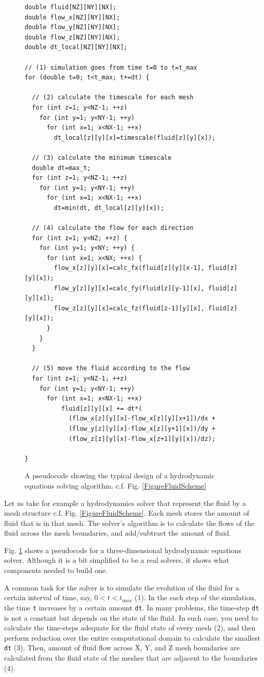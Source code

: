 \documentclass[twocolumn]{article}
\begin{document}
\begin{figure}
\begin{verbatim}
double fluid[NZ][NY][NX];
double flow_x[NZ][NY][NX];
double flow_y[NZ][NY][NX];
double flow_z[NZ][NY][NX];
double dt_local[NZ][NY][NX];

// (1) simulation goes from time t=0 to t=t_max
for (double t=0; t<t_max; t+=dt) {

  // (2) calculate the timescale for each mesh
  for (int z=1; y<NZ-1; ++z) 
    for (int y=1; y<NY-1; ++y) 
      for (int x=1; x<NX-1; ++x) 
        dt_local[z][y][x]=timescale(fluid[z][y][x]);

  // (3) calculate the minimum timescale
  double dt=max_t;
  for (int z=1; y<NZ-1; ++z) 
    for (int y=1; y<NY-1; ++y) 
      for (int x=1; x<NX-1; ++x) 
        dt=min(dt, dt_local[z][y][x]);

  // (4) calculate the flow for each direction
  for (int z=1; y<NZ; ++z) {
    for (int y=1; y<NY; ++y) { 
      for (int x=1; x<NX; ++x) { 
        flow_x[z][y][x]=calc_fx(fluid[z][y][x-1], fluid[z][y][x]);
        flow_y[z][y][x]=calc_fy(fluid[z][y-1][x], fluid[z][y][x]);
        flow_z[z][y][x]=calc_fz(fluid[z-1][y][x], fluid[z][y][x]);
      }
    }
  }

  // (5) move the fluid according to the flow
  for (int z=1; y<NZ-1; ++z) 
    for (int y=1; y<NY-1; ++y) 
      for (int x=1; x<NX-1; ++x)
          fluid[z][y][x] += dt*(
            (flow_x[z][y][x]-flow_x[z][y][x+1])/dx +
            (flow_y[z][y][x]-flow_x[z][y+1][x])/dy +
            (flow_z[z][y][x]-flow_x[z+1][y][x])/dz);

}
\end{verbatim}
  \caption{A pseudocode showing the typical design of a hydrodynamic
    equations solving algorithm.  c.f.  Fig. \ref{FigureFluidScheme}
  }\label{FigureHydroPseudoCode}
\end{figure}

Let us take for example a hydrodynamics solver that represent the
fluid by a mesh structure c.f. Fig. \ref{FigureFluidScheme}. Each mesh
stores the amount of fluid that is in that mesh. The solver's
algorithm is to calculate the flows of the fluid across the mesh
boundaries, and add/subtract the amount of fluid.

Fig. \ref{FigureHydroPseudoCode} shows a pseudocode for a
three-dimensional hydrodynamic equations solver. Although it is a bit
simplified to be a real solvers, it shows what components needed to
build one.

A common task for the solver is to simulate the evolution of the fluid for a
certain interval of time, say, $0 < t < t_{\mathrm max}$ (1). In the each step
of the simulation, the time {\tt t} increases by a certain amount {\tt dt}.
In many problems, the time-step {\tt dt} is not a constant but depends on the
state of the fluid. In such case, you need to calculate the time-steps adequate
for the fluid state of every mesh (2), and then perform reduction over the
entire computational domain to calculate the smallest {\tt dt} (3). Then,
amount of fluid flow across X, Y, and Z mesh boundaries are calculated from
the fluid state of the meshes that are adjacent to the boundaries (4). 
\end{document}
